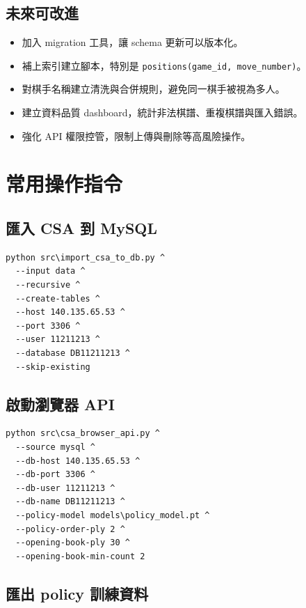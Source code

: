\documentclass[12pt,a4paper,fontset=none]{ctexart}
\begin{document}
\subsection{未來可改進}

\begin{itemize}
  \item 加入 migration 工具，讓 schema 更新可以版本化。
  \item 補上索引建立腳本，特別是 \texttt{positions(game\_id, move\_number)}。
  \item 對棋手名稱建立清洗與合併規則，避免同一棋手被視為多人。
  \item 建立資料品質 dashboard，統計非法棋譜、重複棋譜與匯入錯誤。
  \item 強化 API 權限控管，限制上傳與刪除等高風險操作。
\end{itemize}

\section{常用操作指令}

\subsection{匯入 CSA 到 MySQL}

\begin{lstlisting}[style=cmd]
python src\import_csa_to_db.py ^
  --input data ^
  --recursive ^
  --create-tables ^
  --host 140.135.65.53 ^
  --port 3306 ^
  --user 11211213 ^
  --database DB11211213 ^
  --skip-existing
\end{lstlisting}

\subsection{啟動瀏覽器 API}

\begin{lstlisting}[style=cmd]
python src\csa_browser_api.py ^
  --source mysql ^
  --db-host 140.135.65.53 ^
  --db-port 3306 ^
  --db-user 11211213 ^
  --db-name DB11211213 ^
  --policy-model models\policy_model.pt ^
  --policy-order-ply 2 ^
  --opening-book-ply 30 ^
  --opening-book-min-count 2
\end{lstlisting}

\subsection{匯出 policy 訓練資料}
\end{document}
